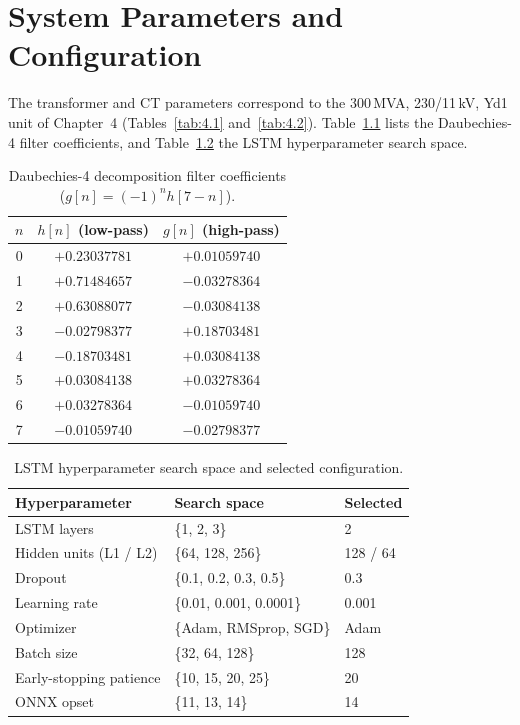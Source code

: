\documentclass[12pt,a4paper,oneside]{report}
\begin{document}
\appendix
\renewcommand{\thechapter}{\Alph{chapter}}
\titleformat{\chapter}[display]{\centering\normalfont\bfseries}{\Large APPENDIX \thechapter}{6pt}{\Large\MakeUppercase}
\chapter{System Parameters and Configuration}
The transformer and CT parameters correspond to the 300\,MVA, 230/11\,kV, Yd1 unit of Chapter~4 (Tables~\ref{tab:4.1} and~\ref{tab:4.2}). Table~\ref{tab:db4} lists the Daubechies-4 filter coefficients, and Table~\ref{tab:hyper} the LSTM hyperparameter search space.
\begin{table}[H]\centering\caption{Daubechies-4 decomposition filter coefficients ($g[n]=(-1)^n h[7-n]$).}\label{tab:db4}
\begin{tabular}{@{}ccc@{}}\toprule $n$ & $h[n]$ (low-pass) & $g[n]$ (high-pass)\\ \midrule
0 & $+0.23037781$ & $+0.01059740$\\ 1 & $+0.71484657$ & $-0.03278364$\\ 2 & $+0.63088077$ & $-0.03084138$\\ 3 & $-0.02798377$ & $+0.18703481$\\ 4 & $-0.18703481$ & $+0.03084138$\\ 5 & $+0.03084138$ & $+0.03278364$\\ 6 & $+0.03278364$ & $-0.01059740$\\ 7 & $-0.01059740$ & $-0.02798377$\\ \bottomrule
\end{tabular}\end{table}
\begin{table}[H]\centering\caption{LSTM hyperparameter search space and selected configuration.}\label{tab:hyper}
\begin{tabular}{@{}lll@{}}\toprule \textbf{Hyperparameter} & \textbf{Search space} & \textbf{Selected}\\ \midrule
LSTM layers & \{1, 2, 3\} & 2\\
Hidden units (L1 / L2) & \{64, 128, 256\} & 128 / 64\\
Dropout & \{0.1, 0.2, 0.3, 0.5\} & 0.3\\
Learning rate & \{0.01, 0.001, 0.0001\} & 0.001\\
Optimizer & \{Adam, RMSprop, SGD\} & Adam\\
Batch size & \{32, 64, 128\} & 128\\
Early-stopping patience & \{10, 15, 20, 25\} & 20\\
ONNX opset & \{11, 13, 14\} & 14\\ \bottomrule
\end{tabular}\end{table}
\end{document}
